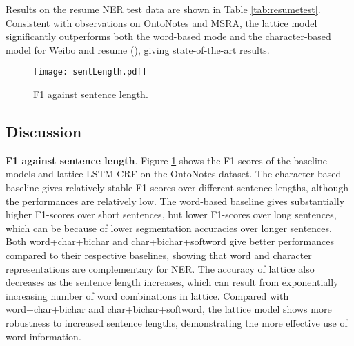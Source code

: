 \documentclass[11pt,a4paper]{article}
\begin{document}
\begin{CJK*}{UTF8}{gbsn}
Results on the resume NER test data are shown in Table \ref{tab:resumetest}. Consistent with observations on OntoNotes and MSRA, the lattice model significantly outperforms both the word-based mode and the character-based model for Weibo and resume (), giving state-of-the-art results.
 



\begin{table}[!tp]
\begin{center}
\end{center}
\caption{Main results on resume NER.}
\label{tab:resumetest}
\end{table}

\begin{figure}[!tp] 
  \centering 
  \texttt{[image: sentLength.pdf]}
  \vspace*{-5mm}
  \caption{F1 against sentence length.}
  \label{fig:sentLength}
\end{figure}


\subsection{Discussion}
\noindent \textbf{F1 against sentence length}. Figure \ref{fig:sentLength} shows the F1-scores of the baseline models and lattice LSTM-CRF on the OntoNotes dataset. The character-based baseline gives relatively stable F1-scores over different sentence lengths, although the performances are relatively low. The word-based baseline gives substantially higher F1-scores over short sentences, but lower F1-scores over long sentences, which can be because of lower segmentation accuracies over longer sentences. Both word+char+bichar and char+bichar+softword give better performances compared to their respective baselines, showing that word and character representations are complementary for NER. The accuracy of lattice also decreases as the sentence length increases, which can result from exponentially increasing number of word combinations in lattice. Compared with word+char+bichar and char+bichar+softword, the lattice model shows more robustness to increased sentence lengths, demonstrating the more effective use of word information. 


\end{CJK*}
\end{document}
